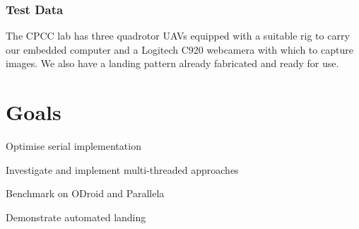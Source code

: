 \documentclass[10pt, twocolumn]{scrartcl} %
\begin{document}
\subsubsection*{Test Data}
The CPCC lab has three quadrotor UAVs equipped with a suitable rig to carry our embedded computer and a Logitech C920 webcamera with which to capture images. We also have a landing pattern already fabricated and ready for use.

\section*{Goals}
\begin{compactenum}
\item{Optimise serial implementation}
\item{Investigate and implement multi-threaded approaches}
\item{Benchmark on ODroid and Parallela}
\item{Demonstrate automated landing}
\end{compactenum}

\printbibliography
\end{document}
